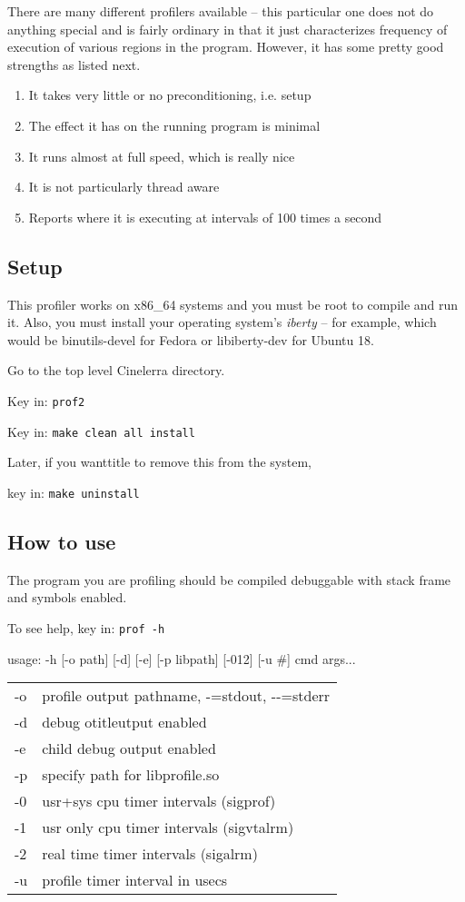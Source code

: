 There are many different profilers available -- this particular one does not do anything special and is fairly ordinary in that it just characterizes frequency of execution of various regions in the program. However, it has some pretty good strengths as listed next.

\begin{enumerate}[nosep]
	\item It takes very little or no preconditioning, i.e. setup
	\item The effect it has on the running program is minimal
	\item It runs almost at full speed, which is really nice
	\item It is not particularly thread aware
	\item Reports where it is executing at intervals of 100 times a second
\end{enumerate}

\subsection{Setup}
\label{sub:setup}

This profiler works on x86\_64 systems and you must be root to compile and run it. Also, you must install your operating system's \textit{iberty} -- for example, which would be binutils-devel for Fedora or libiberty-dev for Ubuntu 18.

Go to the top level Cinelerra directory.

Key in: \qquad \texttt{prof2}

Key in: \qquad \texttt{make clean all install}

Later, if you wanttitle to remove this from the system,

key in: \qquad \texttt{make uninstall}

\subsection{How to use}
\label{sub:how_to_use}

The program you are profiling should be compiled debuggable with stack frame and symbols enabled.

To see help, key in: \qquad \texttt{prof -h}

usage: -h [-o path] [-d] [-e] [-p libpath] [-012] [-u \#] cmd args...

\hspace{2em}
\begin{tabular}{@{}ll}
	-o & profile output pathname, -=stdout, -{}-=stderr\\
	-d & debug otitleutput enabled\\
	-e & child debug output enabled\\
	-p & specify path for libprofile.so\\
	-0 & usr+sys cpu timer intervals (sigprof)\\
	-1 & usr only cpu timer intervals (sigvtalrm)\\
	-2 & real time timer intervals (sigalrm)\\
	-u & profile timer interval in usecs\\
\end{tabular}


